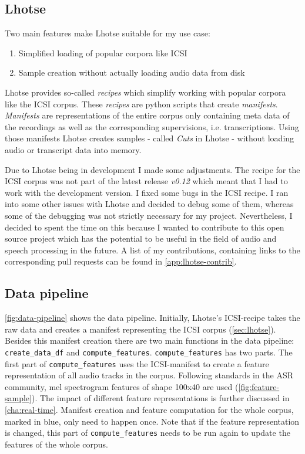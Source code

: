 \documentclass[bsc,frontabs,parskip,deptreport]{infthesis}
\begin{document}
\subsection{Lhotse} \label{sec:lhotse}
Two main features make Lhotse suitable for my use case:
\begin{enumerate}
    \item Simplified loading of popular corpora like ICSI
    \item Sample creation without actually loading audio data from disk
\end{enumerate}

Lhotse provides so-called \textit{recipes} which simplify working with popular corpora like the ICSI corpus.
These \textit{recipes} are python scripts that create \textit{manifests}.
\textit{Manifests} are representations of the entire corpus only containing meta data of the recordings as well as the corresponding supervisions, i.e. transcriptions.
Using those manifests Lhotse creates samples - called \textit{Cuts} in Lhotse - without loading audio or transcript data into memory. 

Due to Lhotse being in development I made some adjustments. The recipe for the ICSI corpus was not part of the latest release \textit{v0.12} which meant that I had to work with the development version. 
I fixed some bugs in the ICSI recipe. 
I ran into some other issues with Lhotse and decided to debug some of them, whereas some of the debugging was not strictly necessary for my project. 
Nevertheless, I decided to spent the time on this because I wanted to contribute to this open source project which has the potential to be useful in the field of audio and speech processing in the future. A list of my contributions, containing links to the corresponding pull requests can be found in \autoref{app:lhotse-contrib}.

\subsection{Data pipeline} \label{sec:ml-data-pipeline}

\autoref{fig:data-pipeline} shows the data pipeline.
Initially, Lhotse's ICSI-recipe takes the raw data and creates a manifest representing the ICSI corpus (\autoref{sec:lhotse}).
Besides this manifest creation there are two main functions in the data pipeline: \verb|create_data_df| and \verb|compute_features|. 
\verb|compute_features| has two parts.
The first part of \verb|compute_features| uses the ICSI-manifest to create a feature representation of all audio tracks in the corpus. Following standards in the ASR community, mel spectrogram features of shape 100x40 are used (\autoref{fig:feature-sample}). The impact of different feature representations is further discussed in \autoref{cha:real-time}. 
Manifest creation and feature computation for the whole corpus, marked in blue, only need to happen once.
Note that if the feature representation is changed, this part of \verb|compute_features| needs to be run again to update the features of the whole corpus.
\end{document}
